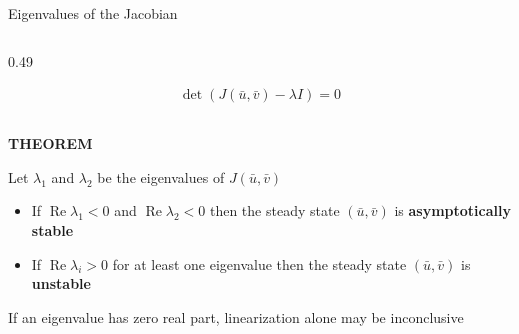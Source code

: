 \begin{frame}{Eigenvalues of the Jacobian}
\begin{columns}[c,onlytextwidth]
\begin{column}{0.49\textwidth}
    \vspace{-0.28cm}

    {\color{HydraWhite}\fontsize{9.4}{12}\selectfont
    \begin{align*}
      \det\!\left(
        J(\bar u,\bar v)-\lambda I
      \right)=0
    \end{align*}
    }
  \end{column}

\end{columns}

\vspace{-0.32cm}

\begin{center}
  \begin{minipage}{0.90\textwidth}

    {\color{HydraGold}\bfseries\fontsize{9.2}{11}\selectfont
      THEOREM
    \par}

    \vspace{0.12cm}

    {\color{HydraWhite}\fontsize{8.4}{10.5}\selectfont
      Let $\lambda_1$ and $\lambda_2$ be the eigenvalues of
      $J(\bar u,\bar v)$
    \par}

    \vspace{0.18cm}

    {\color{HydraBody}\fontsize{8.6}{10.8}\selectfont
    \begin{itemize}
      \setlength{\itemsep}{0.28cm}

      \item
        If
        $\operatorname{Re}\lambda_1<0$
        and
        $\operatorname{Re}\lambda_2<0$
        then the steady state $(\bar u,\bar v)$ is
        \textcolor{HydraCyan}{\bfseries asymptotically stable}

      \item
        If
        $\operatorname{Re}\lambda_i>0$
        for at least one eigenvalue then the steady state
        $(\bar u,\bar v)$ is
        \textcolor{HydraRed}{\bfseries unstable}

    \end{itemize}
    }

    \vspace{0.12cm}

    {\color{HydraMuted}\fontsize{7.2}{8.8}\selectfont
      If an eigenvalue has zero real part, linearization alone may be inconclusive
    \par}

  \end{minipage}
\end{center}

\end{frame}



